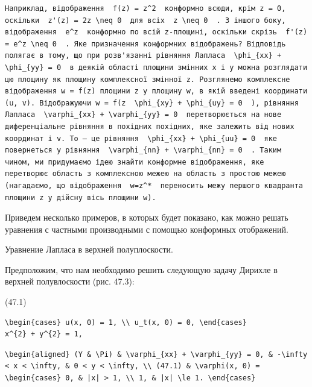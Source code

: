 \documentclass[
  ukrainian,
]{article}
\begin{document}
\begin{verbatim}
Наприклад, відображення  f(z) = z^2  конформно всюди, крім z = 0, оскільки  z'(z) = 2z \neq 0  для всіх  z \neq 0  . З іншого боку, відображення  e^z  конформно по всій z-площині, оскільки скрізь  f'(z) = e^z \neq 0  . Яке призначення конформних відображень? Відповідь полягає в тому, що при розв'язанні рівняння Лапласа  \phi_{xx} + \phi_{yy} = 0  в деякій області площини змінних x і y можна розглядати цю площину як площину комплексної змінної z. Розглянемо комплексне відображення w = f(z) площини z у площину w, в якій введені координати (u, v). Відображуючи w = f(z  \phi_{xy} + \phi_{uy} = 0  ), рівняння Лапласа  \varphi_{xx} + \varphi_{yy} = 0  перетворюється на нове диференціальне рівняння в похідних похідних, яке залежить від нових координат і v. To — це рівняння  \phi_{xx} + \phi_{uu} = 0  яке повернеться у рівняння  \varphi_{nn} + \varphi_{nn} = 0  . Таким чином, ми придумаємо ідею знайти конформне відображення, яке перетворює область з комплексною межею на область з простою межею (нагадаємо, що відображення  w=z^*  переносить межу першого квадранта площини z у дійсну вісь площини w).
\end{verbatim}

Приведем несколько примеров, в которых будет показано, как можно решать
уравнения с частными производными с помощью конформных отображений.

Уравнение Лапласа в верхней полуплоскости.

Предположим, что нам необходимо решить следующую задачу Дирихле в
верхней полувлоскости (рис. 47.3):

(47.1)

\begin{verbatim}
\begin{cases} u(x, 0) = 1, \\ u_t(x, 0) = 0, \end{cases}
x^{2} + y^{2} = 1,
\end{verbatim}

\begin{verbatim}
\begin{aligned} (Y & \Pi) & \varphi_{xx} + \varphi_{yy} = 0, & -\infty < x < \infty, & 0 < y < \infty, \\ (47.1) & \varphi(x, 0) = \begin{cases} 0, & |x| > 1, \\ 1, & |x| \le 1. \end{cases}
\end{verbatim}
\end{document}
